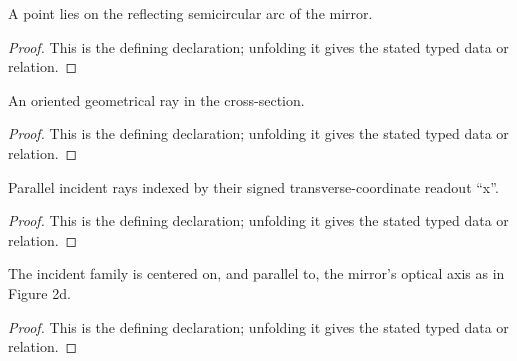 \begin{definition}[OnReflectingArc]
  \label{decl:physics:IPhO_2026_2_A_1:OnReflectingArc}
  A point lies on the reflecting semicircular arc of the mirror.
\end{definition}
\begin{proof}
  This is the defining declaration; unfolding it gives the stated typed data or relation.
\end{proof}

\begin{definition}[GeometricRay]
  \label{decl:physics:IPhO_2026_2_A_1:GeometricRay}
  An oriented geometrical ray in the cross-section.
\end{definition}
\begin{proof}
  This is the defining declaration; unfolding it gives the stated typed data or relation.
\end{proof}

\begin{definition}[ParallelIncidentRayFamily]
  \label{decl:physics:IPhO_2026_2_A_1:ParallelIncidentRayFamily}
  Parallel incident rays indexed by their signed transverse-coordinate readout “x”.
\end{definition}
\begin{proof}
  This is the defining declaration; unfolding it gives the stated typed data or relation.
\end{proof}

\begin{definition}[AlignedWithMirror]
  \label{decl:physics:IPhO_2026_2_A_1:AlignedWithMirror}
  The incident family is centered on, and parallel to, the mirror's optical axis as in Figure 2d.
\end{definition}
\begin{proof}
  This is the defining declaration; unfolding it gives the stated typed data or relation.
\end{proof}

